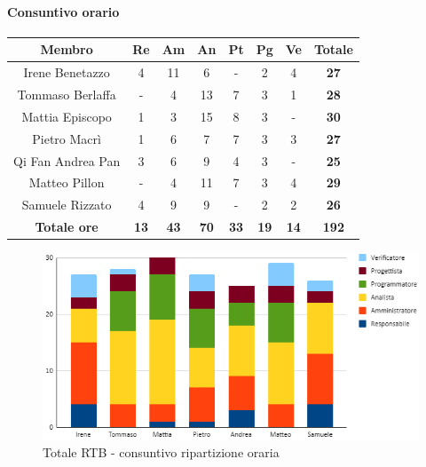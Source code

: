 \paragraph{Consuntivo orario}
\begin{center}
	\renewcommand{\arraystretch}{1.8}
	\begin{tabular}{ |c|c|c|c|c|c|c|c| }
	\hline
	\textbf{Membro} & \textbf{Re} & \textbf{Am} &  \textbf{An} &  \textbf{Pt} &  \textbf{Pg} &  \textbf{Ve} &  \textbf{Totale}\\
    \hline
    Irene Benetazzo   & 4 & 11 & 6 & - & 2 & 4 & \textbf{27} \\
    \hline
    Tommaso Berlaffa  & - & 4 & 13 & 7 & 3 & 1 & \textbf{28} \\
    \hline
    Mattia Episcopo   & 1 & 3 & 15 & 8 & 3 & - & \textbf{30} \\
    \hline
    Pietro Macrì      & 1 & 6 & 7 & 7 & 3 & 3 & \textbf{27} \\
    \hline
    Qi Fan Andrea Pan & 3 & 6 & 9 & 4 & 3 & - & \textbf{25} \\
    \hline
    Matteo Pillon     & - & 4 & 11 & 7 & 3 & 4 & \textbf{29} \\
    \hline
    Samuele Rizzato   & 4 & 9 & 9 & - & 2 & 2 & \textbf{26} \\
    \hline
    \textbf{Totale ore} & \textbf{13} & \textbf{43} &  \textbf{70} &  \textbf{33} &  \textbf{19} &  \textbf{14} &  \textbf{192}\\
    \hline
	\end{tabular}
\end{center}
\begin{figure}[H]
    \centering\includegraphics[width=\textwidth, height=\textheight,keepaspectratio]{images/consuntivo/RTB-ore.png}
    \caption{Totale RTB - consuntivo ripartizione oraria}
\end{figure}

